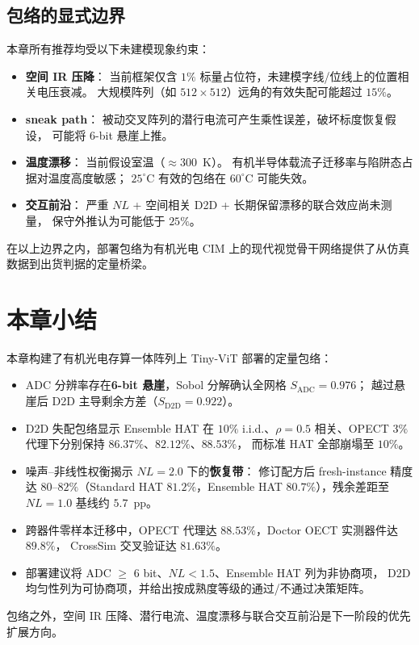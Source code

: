 \subsection{包络的显式边界}

本章所有推荐均受以下未建模现象约束：
\begin{itemize}
    \item \textbf{空间 IR 压降}：
    当前框架仅含 $1\%$ 标量占位符，未建模字线/位线上的位置相关电压衰减。
    大规模阵列（如 $512\times512$）远角的有效失配可能超过 $15\%$。
    \item \textbf{ sneak path}：
    被动交叉阵列的潜行电流可产生乘性误差，破坏标度恢复假设，
    可能将 6-bit 悬崖上推。
    \item \textbf{温度漂移}：
    当前假设室温（$\approx 300$~K）。
    有机半导体载流子迁移率与陷阱态占据对温度高度敏感；
    $25^{\circ}$C 有效的包络在 $60^{\circ}$C 可能失效。
    \item \textbf{交互前沿}：
    严重 $NL$ + 空间相关 D2D + 长期保留漂移的联合效应尚未测量，
    保守外推认为可能低于 $25\%$。
\end{itemize}

在以上边界之内，部署包络为有机光电 CIM 上的现代视觉骨干网络提供了从仿真数据到出货判据的定量桥梁。


\section*{本章小结}

本章构建了有机光电存算一体阵列上 Tiny-ViT 部署的定量包络：
\begin{itemize}
    \item ADC 分辨率存在\textbf{6-bit 悬崖}，Sobol 分解确认全网格 $S_{\mathrm{ADC}}=0.976$；
    越过悬崖后 D2D 主导剩余方差（$S_{\mathrm{D2D}}=0.922$）。
    \item D2D 失配包络显示 Ensemble HAT 在 $10\%$ i.i.d.、$\rho=0.5$ 相关、OPECT $3\%$ 代理下分别保持 $86.37\%$、$82.12\%$、$88.53\%$，
    而标准 HAT 全部崩塌至 $10\%$。
    \item 噪声--非线性权衡揭示 $NL=2.0$ 下的\textbf{恢复带}：
    修订配方后 fresh-instance 精度达 $80$--$82\%$（Standard HAT $81.2\%$，Ensemble HAT $80.7\%$），残余差距至 $NL=1.0$ 基线约 $5.7$~pp。
    \item 跨器件零样本迁移中，OPECT 代理达 $88.53\%$，Doctor OECT 实测器件达 $89.8\%$，
    CrossSim 交叉验证达 $81.63\%$。
    \item 部署建议将 ADC $\ge$ 6 bit、$NL < 1.5$、Ensemble HAT 列为非协商项，
    D2D 均匀性列为可协商项，并给出按成熟度等级的通过/不通过决策矩阵。
\end{itemize}
包络之外，空间 IR 压降、潜行电流、温度漂移与联合交互前沿是下一阶段的优先扩展方向。
